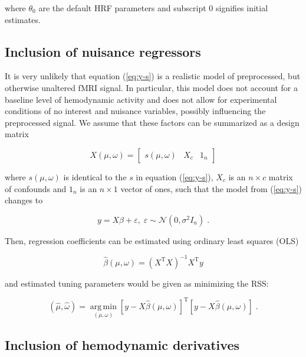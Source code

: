 \documentclass[a4paper,12pt]{article}
\begin{document}
where $\theta_0$ are the default HRF parameters and subscript 0 signifies initial estimates.


\subsection{Inclusion of nuisance regressors}

It is very unlikely that equation (\ref{eq:y-s}) is a realistic model of preprocessed, but otherwise unaltered fMRI signal. In particular, this model does not account for a baseline level of hemodynamic activity and does not allow for experimental conditions of no interest and nuisance variables, possibly influencing the preprocessed signal. We assume that these factors can be summarized as a design matrix

\begin{equation} \label{eq:X}
X(\mu,\omega) = \left[ \begin{matrix} s(\mu,\omega) & X_c & 1_n \end{matrix} \right]
\end{equation}

where $s(\mu,\omega)$ is identical to the $s$ in equation (\ref{eq:y-s}), $X_c$ is an $n \times c$ matrix of confounds and $1_n$ is an $n \times 1$ vector of ones, such that the model from (\ref{eq:y-s}) changes to

\begin{equation} \label{eq:y-X}
y = X \beta + \varepsilon, \; \varepsilon \sim \mathcal{N}(0, \sigma^2 I_n) \; .
\end{equation}

Then, regression coefficients can be estimated using ordinary least squares (OLS)

\begin{equation} \label{eq:b-est-X}
\hat{\beta}(\mu,\omega) = (X^\mathrm{T} X)^{-1} X^\mathrm{T} y
\end{equation}

and estimated tuning parameters would be given as minimizing the RSS:

\begin{equation} \label{eq:mu-tw-est-X}
(\hat{\mu},\hat{\omega}) = \operatorname*{arg\,min}_{(\mu,\omega)} \left[ y - X \hat{\beta}(\mu,\omega) \right]^\mathrm{T} \left[ y - X \hat{\beta}(\mu,\omega) \right] \; .
\end{equation}


\subsection{Inclusion of hemodynamic derivatives} \label{sec:HRF-der}
\end{document}
